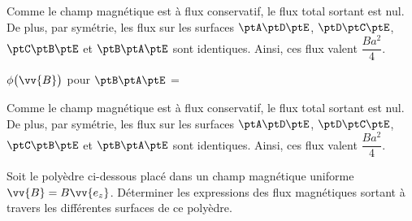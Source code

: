 \begin{corrige}
Comme le champ magnétique est à flux conservatif, le flux total sortant est nul. De plus, par symétrie, les flux sur les surfaces $\ptA\ptD\ptE$, $\ptD\ptC\ptE$, $\ptC\ptB\ptE$ et $\ptB\ptA\ptE$ sont identiques. Ainsi, ces flux valent $\dfrac{Ba^{2}}{4}$.
\end{corrige}




\begin{enonce}
$\phi \big(\vv{B} \big)$ pour $\ptB\ptA\ptE$ =
\end{enonce}
%

\begin{corrige}
Comme le champ magnétique est à flux conservatif, le flux total sortant est nul. De plus, par symétrie, les flux sur les surfaces $\ptA\ptD\ptE$, $\ptD\ptC\ptE$, $\ptC\ptB\ptE$ et $\ptB\ptA\ptE$ sont identiques. Ainsi, ces flux valent $\dfrac{Ba^{2}}{4}$.
\end{corrige}


\finEntrainement







\hauteurLargeurCadreReponse		{8mm}{2.3cm}
\typeEntrainement				{} %
\initialisationEntrainement

Soit le polyèdre ci-dessous placé dans un champ magnétique uniforme $\vv{B} = B\vv{e_z}$.
Déterminer les expressions des flux magnétiques sortant à travers les différentes surfaces de ce polyèdre.

